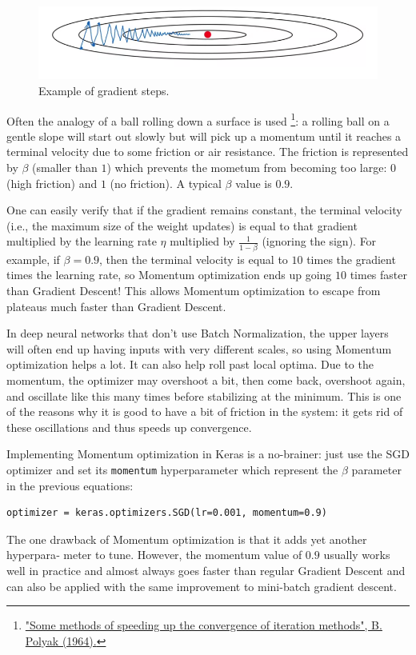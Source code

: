 \begin{figure}
\centering
\includegraphics[scale=0.45]{img/momentum}
\caption{Example of gradient steps.}
\label{img:gradientSteps}
\end{figure}

Often the analogy of a ball rolling down a surface is used
\footnote{\href{https://homl.info/54}{"Some methods of speeding up the convergence of iteration methods", B. Polyak (1964).}}: a rolling ball on a gentle slope will start out slowly but will pick up a momentum until it reaches a terminal velocity due to some friction or air resistance. The friction is represented by $\beta$ (smaller than $1$) which prevents the mometum from becoming too large: $0$ (high friction) and $1$ (no friction). A typical $\beta$ value is $0.9$.

One can easily verify that if the gradient remains constant, the terminal velocity (i.e., the maximum size of the weight updates) is equal to that gradient multiplied by the learning rate $\eta$ multiplied by $\frac{1}{1-\beta}$ (ignoring the sign). For example, if $\beta = 0.9$, then the terminal velocity is equal to $10$ times the gradient times the learning rate, so Momentum optimization ends up going $10$ times faster than Gradient Descent! This allows Momentum optimization to escape from plateaus much faster than Gradient Descent.

In deep neural networks that don't use Batch Normalization, the upper layers will often end up having inputs with very different scales, so using Momentum optimization helps a lot. It can also help roll past local optima. Due to the momentum, the optimizer may overshoot a bit, then come back, overshoot again, and oscillate like this many times before stabilizing at the minimum. This is one of the reasons why it is good to have a bit of friction in the system: it gets rid of these oscillations and thus speeds up convergence. 

Implementing Momentum optimization in Keras is a no-brainer: just use the SGD optimizer and set its \lstinline+momentum+ hyperparameter which represent the $\beta$ parameter in the previous equations:
\begin{lstlisting}
optimizer = keras.optimizers.SGD(lr=0.001, momentum=0.9)
\end{lstlisting}
The one drawback of Momentum optimization is that it adds yet another hyperpara‐ meter to tune. However, the momentum value of $0.9$ usually works well in practice and almost always goes faster than regular Gradient Descent and can also be applied with the same improvement to mini-batch gradient descent.

